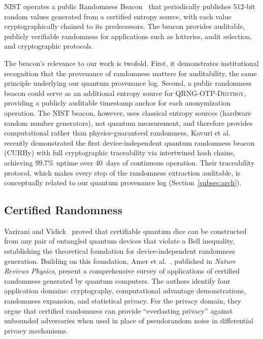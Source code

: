 \documentclass[journal]{IEEEtran}
\begin{document}
NIST operates a public Randomness Beacon~\cite{nist2023beacon} that periodically publishes 512-bit random values generated from a certified entropy source, with each value cryptographically chained to its predecessors. The beacon provides auditable, publicly verifiable randomness for applications such as lotteries, audit selection, and cryptographic protocols.

The beacon's relevance to our work is twofold. First, it demonstrates institutional recognition that the provenance of randomness matters for auditability, the same principle underlying our quantum provenance log. Second, a public randomness beacon could serve as an additional entropy source for \textsc{QRNG-OTP-Destroy}, providing a publicly auditable timestamp anchor for each anonymization operation. The NIST beacon, however, uses classical entropy sources (hardware random number generators), not quantum measurement, and therefore provides computational rather than physics-guaranteed randomness. Kavuri et al.~\cite{kavuri2025traceable} recently demonstrated the first device-independent quantum randomness beacon (CURBy) with full cryptographic traceability via intertwined hash chains, achieving 99.7\% uptime over 40~days of continuous operation. Their traceability protocol, which makes every step of the randomness extraction auditable, is conceptually related to our quantum provenance log (Section~\ref{subsec:arch}).

\subsection{Certified Randomness}
\label{subsec:certified}

Vazirani and Vidick~\cite{vazirani2012certifiable} proved that certifiable quantum dice can be constructed from any pair of entangled quantum devices that violate a Bell inequality, establishing the theoretical foundation for device-independent randomness generation. Building on this foundation, Amer et al.~\cite{amer2025certified}, published in \emph{Nature Reviews Physics}, present a comprehensive survey of applications of certified randomness generated by quantum computers. The authors identify four application domains: cryptography, computational advantage demonstrations, randomness expansion, and statistical privacy. For the privacy domain, they argue that certified randomness can provide ``everlasting privacy'' against unbounded adversaries when used in place of pseudorandom noise in differential privacy mechanisms.
\end{document}
